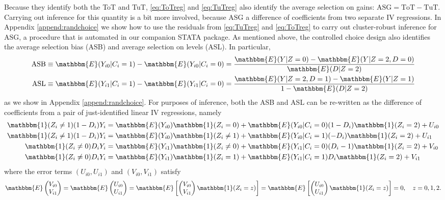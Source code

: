 \documentclass[oneside,11pt]{article}
\begin{document}
Because they identify both the ToT and TuT, \eqref{eq:ToTreg} and \eqref{eq:TuTreg} also identify the average selection on gains: $\text{ASG} = \text{ToT} - \text{TuT}$.
Carrying out inference for this quantity is a bit more involved, because $\text{ASG}$ a difference of coefficients from two separate IV regressions. 
In Appendix \ref{append:randchoice} we show how to use the residuals from \eqref{eq:TuTreg} and \eqref{eq:ToTreg} to carry out cluster-robust inference for $\text{ASG}$, a procedure that is automated in our companion STATA package.
As mentioned above, the controlled choice design also identifies the average selection bias (ASB) and average selection on levels (ASL).
In particular,
\begin{align}
\label{eq:ASB}
    \text{ASB} &\equiv \mathbbm{E}(Y_{i0}|C_i=1) - \mathbbm{E}(Y_{i0}|C_i = 0) = \frac{\mathbbm{E}(Y|Z=0) - \mathbbm{E}(Y|Z=2,D=0)}{\mathbbm{E}(D|Z=2)}\\
    \label{eq:ASL}
    \text{ASL} &\equiv \mathbbm{E}(Y_{i1}|C_i = 1) - \mathbbm{E}(Y_{i1}|C_i=0) = \frac{\mathbbm{E}(Y|Z=2,D=1) - \mathbbm{E}(Y|Z=1)}{1 - \mathbbm{E}(D|Z=2)}
\end{align}
as we show in Appendix \ref{append:randchoice}.
For purposes of inference, both the ASB and ASL can be re-written as the difference of coefficients from a pair of just-identified linear IV regressions, namely
\begin{align}
\label{eq:ASB0}
    \mathbbm{1}(Z_i\neq 1) (1 - D_i) Y_i &= \mathbbm{E}(Y_{i0}) \mathbbm{1}(Z_i = 0) + \mathbbm{E}(Y_{i0}|C_i=0)(1 - D_i)\mathbbm{1}(Z_i=2) + U_{i0}\\
\label{eq:ASB1}
    \mathbbm{1}(Z_i\neq 1) (1 - D_i) Y_i &= \mathbbm{E}(Y_{i0}) \mathbbm{1}(Z_i \neq 1) + \mathbbm{E}(Y_{i0}|C_i=1)(-D_i)\mathbbm{1}(Z_i = 2) + U_{i1}\\
\label{eq:ASL0}
    \mathbbm{1}(Z_i\neq 0) D_i Y_i &= \mathbbm{E}(Y_{i1}) \mathbbm{1}(Z_i \neq 0) + \mathbbm{E}(Y_{i1}|C_i=0)(D_i - 1)\mathbbm{1}(Z_i = 2) + V_{i0}\\
\label{eq:ASL1}
    \mathbbm{1}(Z_i\neq 0) D_i Y_i &= \mathbbm{E}(Y_{i1}) \mathbbm{1}(Z_i = 1) + \mathbbm{E}(Y_{i1}|C_i=1)D_i \mathbbm{1}(Z_i = 2) + V_{i1}
\end{align}
where the error terms $(U_{i0}, U_{i1})$ and $(V_{i0}, V_{i1})$ satisfy
\[
\mathbbm{E}
\begin{pmatrix}
V_{i0} \\ 
V_{i1} \\ 
\end{pmatrix} = 
\mathbbm{E}\begin{pmatrix}
U_{i0} \\ 
U_{i1} \\ 
\end{pmatrix}
= \mathbbm{E}\left[
\begin{pmatrix}
V_{i0} \\ 
V_{i1} \\ 
\end{pmatrix} \mathbbm{1}(Z_i = z)
\right]
= \mathbbm{E}\left[
\begin{pmatrix}
U_{i0} \\ 
U_{i1} \\ 
\end{pmatrix} \mathbbm{1}(Z_i = z)
\right] = 0
, \quad z = 0, 1, 2.
\]
\end{document}
